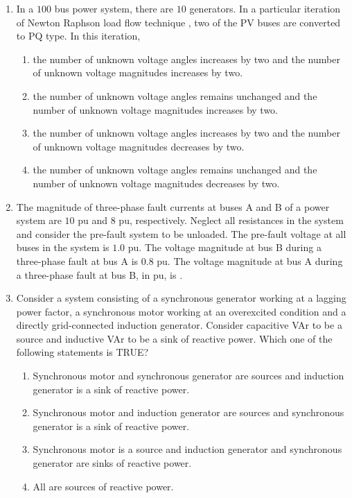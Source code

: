 \documentclass[journal,12pt,onecolumn]{IEEEtran}
\theoremstyle{remark}
\begin{document}
\begin{enumerate}[start=1, label=Q.\arabic*]
    \hfill{}

    \item In a $100$ bus power system, there are $10$ generators. In a particular iteration of Newton Raphson load flow technique , two of the PV buses are converted to PQ type. In this iteration,
    \begin{enumerate}
        \item the number of unknown voltage angles increases by two and the number of unknown voltage magnitudes increases by two.
        \item the number of unknown voltage angles remains unchanged and the number of unknown voltage magnitudes increases by two.
        \item the number of unknown voltage angles increases by two and the number of unknown voltage magnitudes decreases by two.
        \item the number of unknown voltage angles remains unchanged and the number of unknown voltage magnitudes decreases by two.
    \end{enumerate}

    \hfill{}

    \item The magnitude of three-phase fault currents at buses A and B of a power system are $10$ pu and $8$ pu, respectively. Neglect all resistances in the system and consider the pre-fault system to be unloaded. The pre-fault voltage at all buses in the system is $1.0$ pu. The voltage magnitude at bus B during a three-phase fault at bus A is $0.8$ pu. The voltage magnitude at bus A during a three-phase fault at bus B, in pu, is \underline{\hspace{2cm}}.

    \hfill{}

    \item Consider a system consisting of a synchronous generator working at a lagging power factor, a synchronous motor working at an overexcited condition and a directly grid-connected induction generator. Consider capacitive VAr to be a source and inductive VAr to be a sink of reactive power. Which one of the following statements is TRUE?
    \begin{enumerate}
        \item Synchronous motor and synchronous generator are sources and induction generator is a sink of reactive power.
        \item Synchronous motor and induction generator are sources and synchronous generator is a sink of reactive power.
        \item Synchronous motor is a source and induction generator and synchronous generator are sinks of reactive power.
        \item All are sources of reactive power.
    \end{enumerate}


\end{enumerate}
\end{document}
